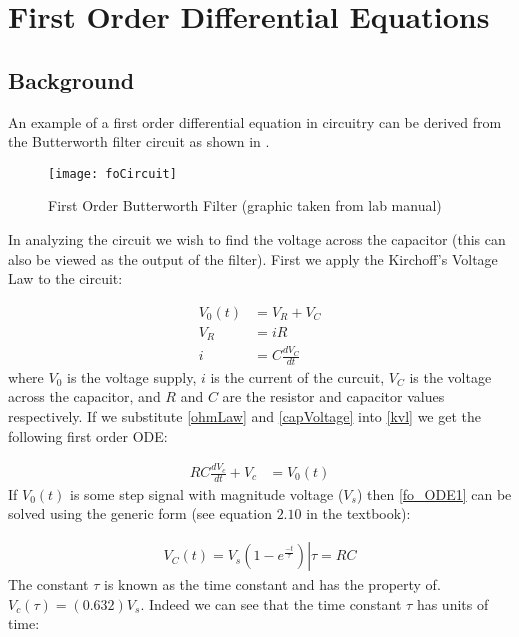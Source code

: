 \documentclass[main.tex]{subfile}
\begin{document}
\section{First Order Differential Equations}
\label{sec:foAnalysis}

\subsection{Background}
\label{sec:fo_analytical_view}

An example of a first order differential equation in circuitry can be derived
from the Butterworth filter circuit as shown in .

\begin{figure}[H]
	\begin{center}
		\texttt{[image: foCircuit]}
	\end{center}
	\caption{First Order Butterworth Filter (graphic taken from lab manual)}
	\label{fig:foCircuit}
\end{figure}

In analyzing the circuit we wish to find the voltage across the capacitor (this
can also be viewed as the output of the filter). First we apply the Kirchoff's
Voltage Law to the circuit:

\begin{align}
	V_0(t) &= V_R + V_C \label{eq:kvl}
	\\V_R &= iR \label{eq:ohmLaw}
	\\i &= C\frac{dV_C}{dt} \label{eq:capVoltage}
\end{align}
where $V_0$ is the voltage supply, $i$ is the current of the curcuit, $V_C$ is
the voltage across the capacitor, and $R$ and $C$ are the resistor and capacitor
values respectively. If we substitute \eqref{ohmLaw} and \eqref{capVoltage} into
\eqref{kvl} we get the following first order ODE:

\begin{align}
	RC\frac{dV_c}{dt} + V_c &= V_0(t) \label{eq:fo_ODE1}
\end{align}
If $V_0(t)$ is some step signal with magnitude voltage ($V_s$) then
\eqref{fo_ODE1} can be solved using the generic form (see equation $2.10$ in the
textbook):

\begin{align}
	V_C(t) = \left. V_s(1 - e^{\frac{-t}{\tau}}) \right| \tau = RC \label{eq:fo_Vc}
\end{align}
The constant $\tau$ is known as the time constant and has the property of.
$V_c(\tau) = (0.632)V_s$. Indeed we can see that the time constant $\tau$ has
units of time: 
\end{document}
